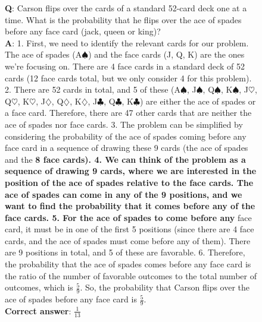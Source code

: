 \begin{figure}[H]
\centering
\begin{tcolorbox}[colback=blue!5!white,colframe=blue!75!black,title=MATH example (\qweninstruct)]
\textbf{Q}: Carson flips over the cards of a standard 52-card deck one at a time. What is the probability that he flips over the ace of spades before any face card (jack, queen or king)?
\\

\textbf{A}: 1. First, we need to identify the relevant cards for our problem. The ace of spades (A$\spadesuit$) and the face cards (J, Q, K) are the ones we're focusing on. There are 4 face cards in a standard deck of 52 cards (12 face cards total, but we only consider 4 for this problem). 2. There are 52 cards in total, and 5 of these (A$\spadesuit$, J$\spadesuit$, Q$\spadesuit$, K$\spadesuit$, J$\heartsuit$, Q$\heartsuit$, K$\heartsuit$, J$\diamondsuit
$, Q$\diamondsuit
$, K$\diamondsuit
$, J$\clubsuit
$, Q$\clubsuit
$, K$\clubsuit
$) are either the ace of spades or a face card. Therefore, there are 47 other cards that are neither the ace of spades nor face cards. 3. The problem can be simplified by considering the probability of the ace of spades coming before any face card in a sequence of drawing these 9 cards (the ace of spades and the \textbf{8 face cards). 4. We can think of the problem as a sequence of drawing 9 cards, where we are interested in the position of the ace of spades relative to the face cards. The ace of spades can come in any of the 9 positions, and we want to find the probability that it comes before any of the face cards. 5. For the ace of spades to come before any} face card, it must be in one of the first 5 positions (since there are 4 face cards, and the ace of spades must come before any of them). There are 9 positions in total, and 5 of these are favorable. 6. Therefore, the probability that the ace of spades comes before any face card is the ratio of the number of favorable outcomes to the total number of outcomes, which is \(\frac{5}{9}\). So, the probability that Carson flips over the ace of spades before any face card is \(\boxed{\frac{5}{9}}\).\\

\textbf{Correct answer}: $\frac{1}{13}$
\end{tcolorbox}
\end{figure}



